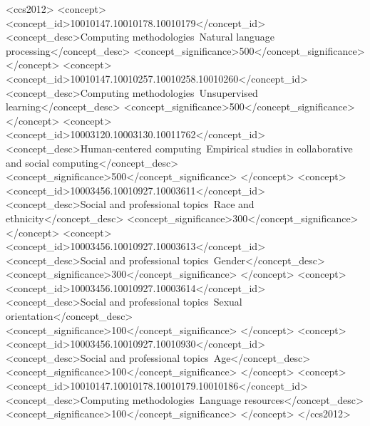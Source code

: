 \documentclass[manuscript,screen,review,anonymous]{acmart}
\theoremstyle{acmplain}
\theoremstyle{researchquestionstyle}
\begin{document}
\begin{CCSXML}
	<ccs2012>
	<concept>
	<concept_id>10010147.10010178.10010179</concept_id>
	<concept_desc>Computing methodologies~Natural language processing</concept_desc>
	<concept_significance>500</concept_significance>
	</concept>
	<concept>
	<concept_id>10010147.10010257.10010258.10010260</concept_id>
	<concept_desc>Computing methodologies~Unsupervised learning</concept_desc>
	<concept_significance>500</concept_significance>
	</concept>
	<concept>
	<concept_id>10003120.10003130.10011762</concept_id>
	<concept_desc>Human-centered computing~Empirical studies in collaborative and social computing</concept_desc>
	<concept_significance>500</concept_significance>
	</concept>
	<concept>
	<concept_id>10003456.10010927.10003611</concept_id>
	<concept_desc>Social and professional topics~Race and ethnicity</concept_desc>
	<concept_significance>300</concept_significance>
	</concept>
	<concept>
	<concept_id>10003456.10010927.10003613</concept_id>
	<concept_desc>Social and professional topics~Gender</concept_desc>
	<concept_significance>300</concept_significance>
	</concept>
	<concept>
	<concept_id>10003456.10010927.10003614</concept_id>
	<concept_desc>Social and professional topics~Sexual orientation</concept_desc>
	<concept_significance>100</concept_significance>
	</concept>
	<concept>
	<concept_id>10003456.10010927.10010930</concept_id>
	<concept_desc>Social and professional topics~Age</concept_desc>
	<concept_significance>100</concept_significance>
	</concept>
	<concept>
	<concept_id>10010147.10010178.10010179.10010186</concept_id>
	<concept_desc>Computing methodologies~Language resources</concept_desc>
	<concept_significance>100</concept_significance>
	</concept>
	</ccs2012>
\end{CCSXML}



\maketitle
\end{document}
